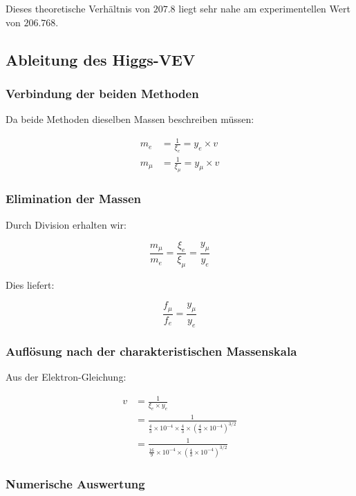 \documentclass[12pt,a4paper]{article}
\theoremstyle{definition}
\begin{document}
Dieses theoretische Verh{\"a}ltnis von $207.8$ liegt sehr nahe am experimentellen Wert von $206.768$.

\subsection{Ableitung des Higgs-VEV}

\subsubsection{Verbindung der beiden Methoden}

Da beide Methoden dieselben Massen beschreiben m{\"u}ssen:

\begin{align}
	m_e &= \frac{1}{\xi_e} = y_e \times v\\
	m_\mu &= \frac{1}{\xi_\mu} = y_\mu \times v
\end{align}

\subsubsection{Elimination der Massen}

Durch Division erhalten wir:

\begin{equation}
	\frac{m_\mu}{m_e} = \frac{\xi_e}{\xi_\mu} = \frac{y_\mu}{y_e}
\end{equation}

Dies liefert:

\begin{equation}
	\frac{f_\mu}{f_e} = \frac{y_\mu}{y_e}
\end{equation}

\subsubsection{Aufl{\"o}sung nach der charakteristischen Massenskala}

Aus der Elektron-Gleichung:

\begin{align}
	v &= \frac{1}{\xi_e \times y_e}\\
	&= \frac{1}{\frac{4}{3} \times 10^{-4} \times \frac{4}{3} \times \left(\frac{4}{3} \times 10^{-4}\right)^{3/2}}\\
	&= \frac{1}{\frac{16}{9} \times 10^{-4} \times \left(\frac{4}{3} \times 10^{-4}\right)^{3/2}}
\end{align}

\subsubsection{Numerische Auswertung}
\end{document}
